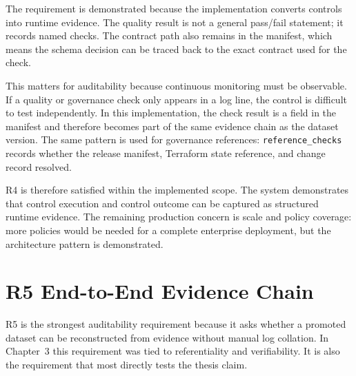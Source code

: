 The requirement is demonstrated because the implementation converts controls
into runtime evidence. The quality result is not a general pass/fail statement;
it records named checks. The contract path also remains in the manifest, which
means the schema decision can be traced back to the exact contract used for the
check.

This matters for auditability because continuous monitoring must be observable.
If a quality or governance check only appears in a log line, the control is
difficult to test independently. In this implementation, the check result is a
field in the manifest and therefore becomes part of the same evidence chain as
the dataset version. The same pattern is used for governance references:
\texttt{reference\_checks} records whether the release manifest, Terraform
state reference, and change record resolved.

R4 is therefore satisfied within the implemented scope. The system demonstrates
that control execution and control outcome can be captured as structured
runtime evidence. The remaining production concern is scale and policy
coverage: more policies would be needed for a complete enterprise deployment,
but the architecture pattern is demonstrated.

\section{R5 End-to-End Evidence Chain}
\noindent
R5 is the strongest auditability requirement because it asks whether a promoted
dataset can be reconstructed from evidence without manual log collation. In
Chapter~3 this requirement was tied to referentiality and verifiability. It is
also the requirement that most directly tests the thesis claim.

